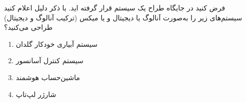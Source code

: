 فرض کنید در جایگاه طراح یک سیستم قرار گرفته اید. با ذکر دلیل اعلام کنید سیستم‌های زیر را به‌صورت آنالوگ یا دیجیتال و یا میکس (ترکیب آنالوگ و دیجیتال) طراحی می‌کنید؟


\begin{enumerate}
	\item 
	سیستم آبیاری خودکار گلدان
	
	\item 
	سیستم کنترل آسانسور
	
	\item 
	ماشین‌حساب هوشمند
	
	\item 
	شارژر لپ‌تاپ
\end{enumerate}

